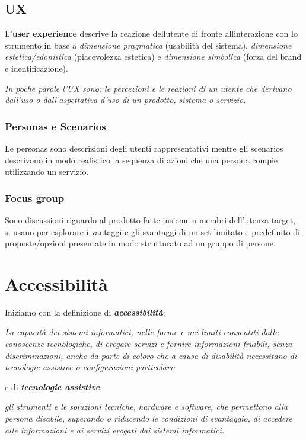 \subsection{UX}\label{ux}

L'\textbf{user experience} descrive la reazione
dell\textquotesingle utente di fronte all\textquotesingle interazione
con lo strumento in base a \emph{dimensione pragmatica} (usabilità del
sistema), \emph{dimensione estetica/edonistica} (piacevolezza estetica)
e \emph{dimensione simbolica} (forza del brand e identificazione).

\emph{In poche parole l'UX sono: le percezioni e le reazioni di un
utente che derivano dall'uso o dall'aspettativa d'uso di un prodotto,
sistema o servizio.}

\subsubsection{Personas e Scenarios}\label{personas-e-scenarios}

Le personas sono descrizioni degli utenti rappresentativi mentre gli
scenarios descrivono in modo realistico la sequenza di azioni che una
persona compie utilizzando un servizio.

\subsubsection{Focus group}\label{focus-group}

Sono discussioni riguardo al prodotto fatte insieme a membri dell'utenza
target, si usano per esplorare i vantaggi e gli svantaggi di un set
limitato e predefinito di proposte/opzioni presentate in modo
strutturato ad un gruppo di persone.

\section{Accessibilità}\label{accessibilituxe0}

Iniziamo con la definizione di \emph{\textbf{accessibilità}}:

\emph{La capacità dei sistemi informatici, nelle forme e nei limiti
consentiti dalle conoscenze tecnologiche, di erogare servizi e fornire
informazioni fruibili, senza discriminazioni, anche da parte di coloro
che a causa di disabilità necessitano di tecnologie assistive o
configurazioni particolari;}

e di \emph{\textbf{tecnologie assistive}}:

\emph{gli strumenti e le soluzioni tecniche, hardware e software, che
permettono alla persona disabile, superando o riducendo le condizioni di
svantaggio, di accedere alle informazioni e ai servizi erogati dai
sistemi informatici.}

